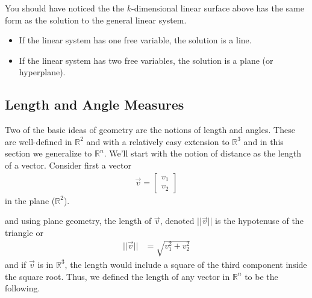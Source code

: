 You should have noticed the the $k$-dimensional linear surface above has the same form as the solution to the general linear system.  

\begin{itemize}
\item If the linear system has one free variable, the solution is a line. 
\item If the linear system has two free variables, the solution is a plane (or hyperplane).  
\end{itemize}


\subsection{Length and Angle Measures}  \label{sect:length:angles}

Two  of the basic ideas of geometry are the notions of length and angles.  These are well-defined in $\mathbb{R}^2$ and with a relatively easy extension to $\mathbb{R}^3$ and in this section we generalize to $\mathbb{R}^n$.   We'll start with the notion of distance as the length of a vector.  Consider first a vector
%
\begin{align*}
\vec{v} = \begin{bmatrix}
v_1 \\ v_2 
\end{bmatrix}
\end{align*}
in the plane ($\mathbb{R}^2$).   
\begin{center}
\end{center}
and using plane geometry, the length of $\vec{v}$, denoted $||\vec{v}||$ is the hypotenuse of the triangle or
%
\begin{align*}
||\vec{v}|| & = \sqrt{v_1^2+v_2^2}
\end{align*}
and if $\vec{v}$ is in $\mathbb{R}^3$, the length would include a square of the third component inside the square root.  Thus, we defined the length of any vector in $\mathbb{R}^n$ to be the following. 

